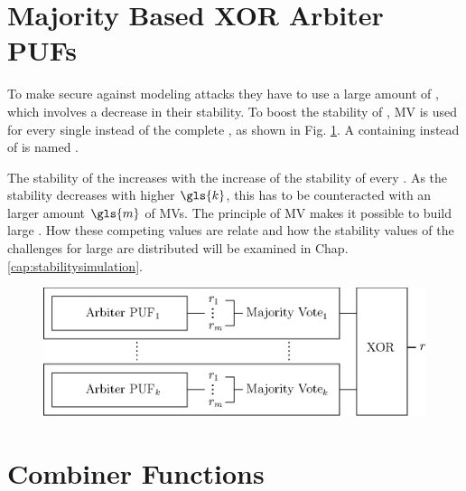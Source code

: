 
\section{Majority Based XOR Arbiter PUFs}
\label{sec:majorityxorarbiter}

To make \xpufs secure against modeling attacks they have to use a large amount of \apufs, which involves a decrease in their stability.
To boost the stability of \xpufs, \ac{MV} is used for every single \apuf instead of the complete \xpuf, as shown in Fig. \ref{fig:majorityxorarbiter}.
A \xpuf containing \mpufs instead of \apufs is named \mxpuf.

The stability of the \xpuf increases with the increase of the stability of every \mpuf.
As the stability decreases with higher $\gls{k}$, this has to be counteracted with an larger amount $\gls{m}$ of \acp{MV}.
The principle of \ac{MV} makes it possible to build large \mxpufs. %
How these competing values are relate and how the stability values of the challenges for large \mxpufs are distributed will be examined in Chap. \ref{cap:stabilitysimulation}.

\begin{figure}[ht]
\centering
\includegraphics[width=1.00\textwidth]{images/majority_xor_arbiter_v2.eps}
\caption[Majority \acs{XOR} \apuf]{\mxpuf}
\label{fig:majorityxorarbiter}
\end{figure}


\section{Combiner Functions}
\label{sec:combinerfunctions}

